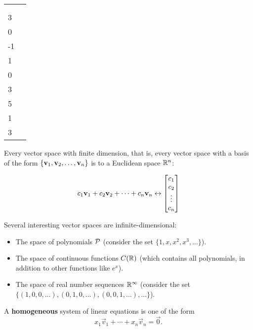 \begin{applicationActivities}
\begin{activity}{15}
\begin{tabular}{ll}
 & \\
     \(\vspan\left\{
    \begin{bmatrix}5\\3\\0\\-1\end{bmatrix},
    \begin{bmatrix}-2\\1\\0\\3\end{bmatrix},
    \begin{bmatrix}4\\5\\1\\3\end{bmatrix}
    \right\}
	\) \\
\end{tabular}
\end{activity}
\begin{fact}
  Every vector space with finite dimension, that is, every
  vector space with a basis of the form
  \(\{\vect v_1,\vect v_2,\dots,\vect v_n\}\) is  to a
  Euclidean space \(\IR^n\):

  \[
    c_1\vect v_1+c_2\vect v_2+\dots+c_n\vect v_n
    \leftrightarrow
    \begin{bmatrix}
      c_1\\c_2\\\vdots\\c_n
    \end{bmatrix}
  \]
\end{fact}

\begin{observation}
  Several interesting vector spaces are infinite-dimensional:
  \begin{itemize}
    \item The space of polynomials \(\P\) (consider the set
          \(\{1,x,x^2,x^3,\dots\}\)).
    \item The space of continuous functions \(C(\IR)\) (which contains
          all polynomials, in addition to other functions like
          \(e^x\)).
    \item The space of real number sequences \(\IR^\infty\) (consider
          the set \(\{(1,0,0,\dots),(0,1,0,\dots),(0,0,1,\dots),\dots\}\)).
  \end{itemize}
\end{observation}

\begin{definition}
A \textbf{homogeneous} system of linear equations is one of the form
\[x_1 \vec{v}_1 + \cdots+x_n \vec{v}_n = \vec{0} .\]


\end{definition}
\end{applicationActivities}
